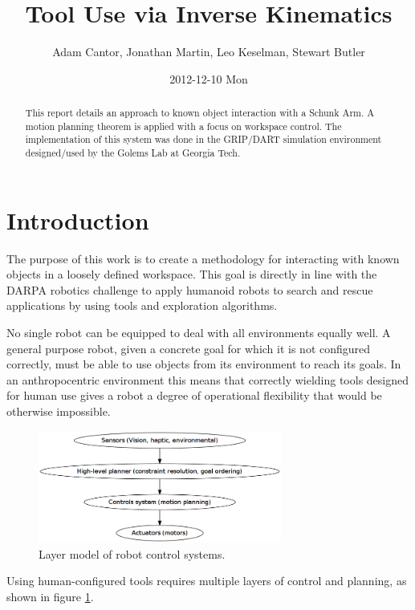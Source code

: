 \documentclass[10pt, conference]{IEEEtran}
\title{Tool Use via Inverse Kinematics}
\author{Adam Cantor, Jonathan Martin, Leo Keselman, Stewart Butler}
\date{2012-12-10 Mon}
\begin{document}
\maketitle






\begin{abstract}
This report details an approach to known object interaction with a
Schunk Arm. A motion planning theorem is applied with a focus on
workspace control. The implementation of this system was done in the
GRIP/DART simulation environment designed/used by the Golems Lab at
Georgia Tech.
\end{abstract}

\section{Introduction}
\label{sec-1}

  The purpose of this work is to create a methodology for interacting
  with known objects in a loosely defined workspace. This goal is
  directly in line with the DARPA robotics challenge to apply humanoid
  robots to search and rescue applications by using tools and
  exploration algorithms.

  No single robot can be equipped to deal with all environments equally
  well. A general purpose robot, given a concrete goal for which it is
  not configured correctly, must be able to use objects from its
  environment to reach its goals. In an anthropocentric environment this
  means that correctly wielding tools designed for human use gives a
  robot a degree of operational flexibility that would be otherwise
  impossible.


\begin{figure}[htb]
\centering
\includegraphics[width=8cm]{robot_layer_model_04acea6317138ac7fb5e808de063a70455ba7e53.png}
\caption{\label{fig:layer_model}Layer model of robot control systems.}
\end{figure}


  Using human-configured tools requires multiple layers of control and
  planning, as shown in figure \ref{fig:layer_model}.
\end{document}
